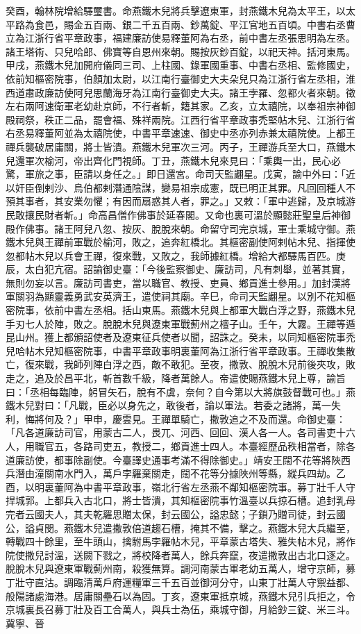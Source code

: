 \begin{pinyinscope}
 癸酉，翰林院增給驛璽書。命燕鐵木兒將兵擊遼東軍，封燕鐵木兒為太平王，以太平路為食邑，賜金五百兩、銀二千五百兩、鈔萬錠、平江官地五百頃。中書右丞曹立為江浙行省平章政事，福建廉訪使易釋董阿為右丞，前中書左丞張思明為左丞。諸王塔術、只兒哈郎、佛寶等自恩州來朝。賜按灰鈔百錠，以祀天神。括河東馬。甲戌，燕鐵木兒加開府儀同三司、上柱國、錄軍國重事、中書右丞相、監修國史，依前知樞密院事，伯顏加太尉，以江南行臺御史大夫朵兒只為江浙行省左丞相，淮西道肅政廉訪使阿兒思蘭海牙為江南行臺御史大夫。諸王孛羅、忽都火者來朝。徵左右兩阿速衛軍老幼赴京師，不行者斬，籍其家。乙亥，立太禧院，以奉祖宗神御殿祠祭，秩正二品，罷會福、殊祥兩院。江西行省平章政事禿堅帖木兒、江浙行省右丞易釋董阿並為太禧院使，中書平章速速、御史中丞亦列赤兼太禧院使。上都王禪兵襲破居庸關，將士皆潰。燕鐵木兒軍次三河。丙子，王禪游兵至大口，燕鐵木兒還軍次榆河，帝出齊化門視師。丁丑，燕鐵木兒來見曰：「乘輿一出，民心必驚，軍旅之事，臣請以身任之。」即日還宮。命司天監翽星。戊寅，諭中外曰：「近以奸臣倒剌沙、烏伯都剌潛通陰謀，變易祖宗成憲，既已明正其罪。凡回回種人不預其事者，其安業勿懼；有因而扇惑其人者，罪之。」又敕：「軍中逃歸，及京城游民敢攘民財者斬。」命高昌僧作佛事於延春閣。又命也裏可溫於顯懿莊聖皇后神御殿作佛事。諸王阿兒八忽、按灰、脫脫來朝。命留守司完京城，軍士乘城守御。燕鐵木兒與王禪前軍戰於榆河，敗之，追奔紅橋北。其樞密副使阿剌帖木兒、指揮使忽都帖木兒以兵會王禪，復來戰，又敗之，我師據紅橋。增給大都驛馬百匹。庚辰，太白犯亢宿。詔諭御史臺：「今後監察御史、廉訪司，凡有刺舉，並著其實，無則勿妄以言。廉訪司書吏，當以職官、教授、吏員、鄉貢進士參用。」加封漢將軍關羽為顯靈義勇武安英濟王，遣使祠其廟。辛巳，命司天監翽星。以別不花知樞密院事，依前中書左丞相。括山東馬。燕鐵木兒與上都軍大戰白浮之野，燕鐵木兒手刃七人於陣，敗之。脫脫木兒與遼東軍戰薊州之檀子山。壬午，大霧。王禪等遁昆山州。獲上都頒詔使者及遼東征兵使者以聞，詔誅之。癸未，以同知樞密院事禿兒哈帖木兒知樞密院事，中書平章政事明裏董阿為江浙行省平章政事。王禪收集散亡，復來戰，我師列陣白浮之西，敵不敢犯。至夜，撒敦、脫脫木兒前後夾攻，敗走之，追及於昌平北，斬首數千級，降者萬餘人。帝遣使賜燕鐵木兒上尊，諭旨曰：「丞相每臨陣，躬冒矢石，脫有不虞，奈何？自今第以大將旗鼓督戰可也。」燕鐵木兒對曰：「凡戰，臣必以身先之，敢後者，論以軍法。若委之諸將，萬一失利，悔將何及？」甲申，慶雲見。王禪單騎亡，撒敦追之不及而還。命御史臺：「凡各道廉訪司官，用蒙古二人，畏兀、河西、回回、漢人各一人。各司書吏十六人，用職官五，各路司吏五，教授二，鄉貢進士四人。本臺經歷品秩相當者，除各道廉訪使，都事除副使。今臺譯史通事考滿不得除御史。」靖安王闊不花等將陜西兵潛由潼關南水門入，萬戶孛羅棄關走，闊不花等分據陜州等縣，縱兵四劫。乙酉，以明裏董阿為中書平章政事，嶺北行省左丞燕不鄰知樞密院事。募丁壯千人守捍城郭。上都兵入古北口，將士皆潰，其知樞密院事竹溫臺以兵掠石槽。追封乳母完者云國夫人，其夫乾羅思贈太保，封云國公，謚忠懿；子鎖乃贈司徒，封云國公，謚貞閔。燕鐵木兒遣撒敦倍道趨石槽，掩其不備，擊之。燕鐵木兒大兵繼至，轉戰四十餘里，至牛頭山，擒駙馬孛羅帖木兒，平章蒙古塔失、雅失帖木兒，將作院使撒兒討溫，送闕下戮之，將校降者萬人，餘兵奔竄，夜遣撒敦出古北口逐之。脫脫木兒與遼東軍戰薊州南，殺獲無算。調河南蒙古軍老幼五萬人，增守京師，募丁壯守直沽。調臨清萬戶府運糧軍三千五百並御河分守，山東丁壯萬人守禦益都、般陽諸處海港。居庸關壘石以為固。丁亥，遼東軍抵京城，燕鐵木兒引兵拒之，令京城裏長召募丁壯及百工合萬人，與兵士為伍，乘城守御，月給鈔三錠、米三斗。冀寧、晉
\end{pinyinscope}
